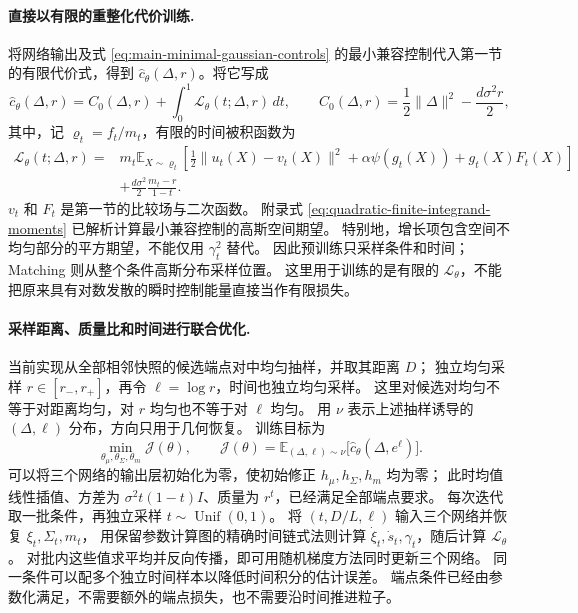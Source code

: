 \documentclass[UTF8,a4paper,11pt,fontset=fandol]{ctexart}
\begin{document}
\paragraph{直接以有限的重整化代价训练.}
将网络输出及式 \eqref{eq:main-minimal-gaussian-controls} 的最小兼容控制代入第一节的有限代价式，得到
$\widehat c_\theta(\Delta,r)$。将它写成
\begin{equation}
\widehat c_\theta(\Delta,r)
=C_0(\Delta,r)+\int_0^1\mathcal L_\theta(t;\Delta,r)\,dt,
\qquad C_0(\Delta,r)=\frac12\|\Delta\|^2-\frac{d\sigma^2r}{2},
\label{eq:mc-finite-pair-decomposition}
\end{equation}
其中，记 $\varrho_t=f_t/m_t$，有限的时间被积函数为
\begin{equation}
\begin{aligned}
\mathcal L_\theta(t;\Delta,r)
={}&m_t\mathbb E_{X\sim\varrho_t}
\left[\frac12\|u_t(X)-v_t(X)\|^2
+\alpha\psi(g_t(X))+g_t(X)F_t(X)\right]\\
&+\frac{d\sigma^2}{2}\frac{m_t-r}{1-t}.
\end{aligned}
\label{eq:mc-finite-time-integrand}
\end{equation}
$v_t$ 和 $F_t$ 是第一节的比较场与二次函数。
附录式 \eqref{eq:quadratic-finite-integrand-moments} 已解析计算最小兼容控制的高斯空间期望。
特别地，增长项包含空间不均匀部分的平方期望，不能仅用 $\gamma_t^2$ 替代。
因此预训练只采样条件和时间；Matching 则从整个条件高斯分布采样位置。
这里用于训练的是有限的 $\mathcal L_\theta$，不能把原来具有对数发散的瞬时控制能量直接当作有限损失。

\paragraph{采样距离、质量比和时间进行联合优化.}
当前实现从全部相邻快照的候选端点对中均匀抽样，并取其距离 $D$；
独立均匀采样 $r\in[r_-,r_+]$，再令 $\ell=\log r$，时间也独立均匀采样。
这里对候选对均匀不等于对距离均匀，对 $r$ 均匀也不等于对 $\ell$ 均匀。
用 $\nu$ 表示上述抽样诱导的 $(\Delta,\ell)$ 分布，方向只用于几何恢复。
训练目标为
\begin{equation}
\min_{\theta_\mu,\theta_\Sigma,\theta_m}
\mathcal J(\theta),\qquad
\mathcal J(\theta)=\mathbb E_{(\Delta,\ell)\sim\nu}
\bigl[\widehat c_\theta(\Delta,e^\ell)\bigr].
\label{eq:amortized-pair-training}
\end{equation}
可以将三个网络的输出层初始化为零，使初始修正 $h_\mu,h_\Sigma,h_m$ 均为零；
此时均值线性插值、方差为 $\sigma^2t(1-t)I$、质量为 $r^t$，已经满足全部端点要求。
每次迭代取一批条件，再独立采样 $t\sim\operatorname{Unif}(0,1)$。
将 $(t,D/L,\ell)$ 输入三个网络并恢复 $\xi_t,\Sigma_t,m_t$，
用保留参数计算图的精确时间链式法则计算 $\dot\xi_t,\dot s_t,\gamma_t$，随后计算 $\mathcal L_\theta$。
对批内这些值求平均并反向传播，即可用随机梯度方法同时更新三个网络。
同一条件可以配多个独立时间样本以降低时间积分的估计误差。
端点条件已经由参数化满足，不需要额外的端点损失，也不需要沿时间推进粒子。
\end{document}
